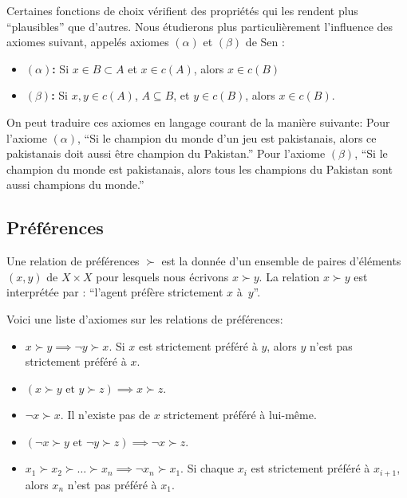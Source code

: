  Certaines fonctions de choix vérifient des propriétés qui les
rendent plus ``plausibles'' que d'autres. Nous étudierons plus
particulièrement l'influence des axiomes suivant, appelés axiomes
$(\alpha)$ et $(\beta)$ de Sen :
\begin{itemize}
\item{\bf $(\alpha)$:} Si $x\in B\subset A$ et $x\in c(A)$, alors
$x\in c(B)$ %
\item{\bf $(\beta)$:} Si $x,y\in c(A)$, $A\subseteq B$, et $y\in
c(B)$, alors $x\in c(B)$.
\end{itemize}
On peut traduire ces axiomes en langage courant de la manière
suivante: Pour l'axiome $(\alpha)$, ``Si le champion du monde d'un
jeu est pakistanais, alors ce pakistanais doit aussi \^etre
champion du Pakistan.'' Pour l'axiome $(\beta)$, ``Si le champion
du monde est pakistanais, alors tous les champions du Pakistan
sont aussi champions du monde.''

\subsection{Préférences}

\begin{definition}
Une relation de préférences $\succ$ est la donnée d'un ensemble de
paires d'éléments $(x,y)$ de $X\times X$ pour lesquels nous
écrivons $x\succ y$. La relation $x\succ y$ est interprétée par :
``l'agent préf\`ere strictement $x$ à~$y$''.
\end{definition}

Voici une liste d'axiomes sur les relations de préférences:
\begin{itemize}
\item[\bf Asymétrie] $x\succ y\implies \neg y\succ x$. Si $x$ est
strictement préféré à $y$, alors $y$ n'est pas strictement préféré
à $x$. %
\item[\bf Transitivité] $(x\succ y\mbox{ et }y\succ z)\implies
x\succ z$. %
\item[\bf Irreflexivité] $\neg x\succ x$. Il n'existe pas de $x$
strictement préféré à lui-m\^eme.%
\item[\bf Transitivité négative] $(\neg x\succ y \mbox{ et }\neg
y\succ z)\implies \neg x\succ z$.%
\item[\bf Acyclicité] $x_1\succ x_2\succ\ldots\succ x_n\implies
\neg x_n\succ x_1$. Si chaque $x_i$ est strictement préféré à
$x_{i+1}$, alors $x_n$ n'est pas préféré à $x_1$.
\end{itemize}


